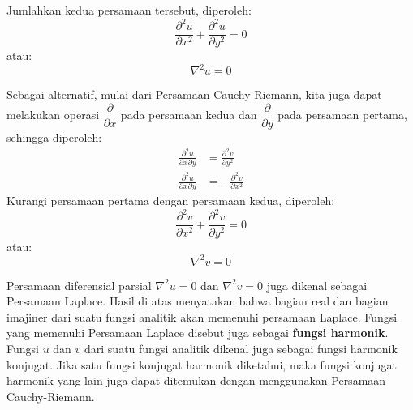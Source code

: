 Jumlahkan kedua persamaan tersebut, diperoleh:
\begin{equation*}
\frac{\partial^{2}u}{\partial x^{2}}+\frac{\partial^{2}u}{\partial y^{2}}=0
\end{equation*}
atau:
\begin{equation}
\nabla^{2} u = 0    
\end{equation}

Sebagai alternatif, mulai dari Persamaan Cauchy-Riemann, kita juga
dapat melakukan operasi $\dfrac{\partial}{\partial x}$ pada persamaan
kedua dan $\dfrac{\partial}{\partial y}$ pada persamaan pertama,
sehingga diperoleh:
\begin{align*}
\frac{\partial^{2}u}{\partial x\partial y} &= \frac{\partial^{2}v}{\partial y^{2}} \\
\frac{\partial^{2}u}{\partial x\partial y} &= -\frac{\partial^{2}v}{\partial x^{2}}
\end{align*}
%
Kurangi persamaan pertama dengan persamaan kedua, diperoleh:
\begin{equation*}
\frac{\partial^{2}v}{\partial x^{2}}+\frac{\partial^{2}v}{\partial y^{2}}=0    
\end{equation*}
atau:
\begin{equation}
\nabla^{2}v=0    
\end{equation}

Persamaan diferensial parsial $\nabla^{2}u=0$ dan $\nabla^{2}v=0$
juga dikenal sebagai Persamaan Laplace. Hasil di atas menyatakan bahwa
bagian real dan bagian imajiner dari suatu fungsi analitik akan memenuhi
persamaan Laplace. Fungsi yang memenuhi Persamaan Laplace disebut
juga sebagai \textbf{fungsi harmonik}. Fungsi $u$ dan $v$ dari suatu
fungsi analitik dikenal juga sebagai fungsi harmonik konjugat. Jika
satu fungsi konjugat harmonik diketahui, maka fungsi konjugat harmonik
yang lain juga dapat ditemukan dengan menggunakan Persamaan Cauchy-Riemann.






